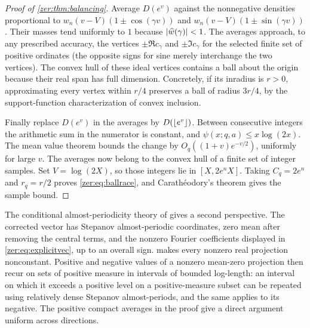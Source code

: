 \begin{proof}[Proof of \cref{zer:thm:balancing}]
Average $D(e^v)$ against the nonnegative densities proportional to
$w_n(v-V)(1\pm\cos(\gamma v))$ and $w_n(v-V)(1\pm\sin(\gamma v))$. Their masses tend
uniformly to $1$ because $\lvert\widehat w(\gamma)\rvert<1$. The averages approach, to any
prescribed accuracy, the vertices $\pm\Re c_\gamma$ and $\pm\Im c_\gamma$ for the selected
finite set of positive ordinates (the opposite signs for sine merely interchange the two
vertices). The convex hull of these ideal vertices contains a ball about the origin because
their real span has full dimension. Concretely, if its inradius is $r>0$, approximating
every vertex within $r/4$ preserves a ball of radius $3r/4$, by the support-function
characterization of convex inclusion.

Finally replace $D(e^v)$ in the averages by $D(\lfloor e^v\rfloor)$. Between consecutive integers
the arithmetic sum in the numerator is constant, and $\psi(x;q,a)\le x\log(2x)$. The mean
value theorem bounds the change by $O_q((1+v)e^{-v/2})$, uniformly for large $v$. The
averages now belong to the convex hull of a finite set of integer samples. Set
$V=\log(2X)$, so those integers lie in $[X,2e^nX]$. Taking $C_q=2e^n$ and $r_q=r/2$ proves
\eqref{zer:eq:ballrace}, and Carath\'eodory's theorem gives the sample bound.
\end{proof}

\begin{remark}\label{zer:rem:stepanov}
The conditional almost-periodicity theory of \cite[Theorem~1(e)]{KaczorowskiRamare2003Almost}
gives a second perspective. The corrected vector has Stepanov almost-periodic coordinates,
zero mean after removing the central terms, and the nonzero Fourier coefficients displayed
in \eqref{zer:eq:explicitvec}, up to an overall sign.  makes every
nonzero real projection nonconstant. Positive and negative values of a nonzero mean-zero
projection then recur on sets of positive measure in intervals of bounded log-length: an
interval on which it exceeds a positive level on a positive-measure subset can be repeated
using relatively dense Stepanov almost-periods, and the same applies to its negative. The
positive compact averages in the proof give a direct argument uniform across directions.
\end{remark}

